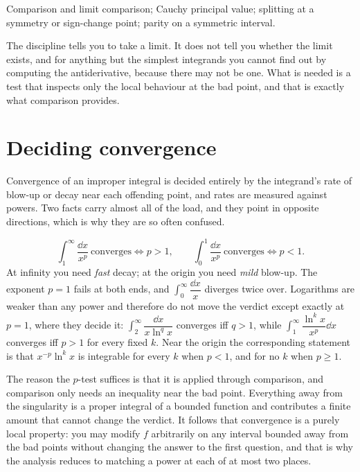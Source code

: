 \begin{seealsob}Comparison and limit comparison; Cauchy principal value; splitting at a symmetry or sign-change point; parity on a symmetric interval.\end{seealsob}

The discipline tells you to take a limit. It does not tell you whether the limit exists, and for anything but the simplest integrands you cannot find out by computing the antiderivative, because there may not be one. What is needed is a test that inspects only the local behaviour at the bad point, and that is exactly what comparison provides.

\section{Deciding convergence}

Convergence of an improper integral is decided entirely by the integrand's rate of blow-up or decay near each offending point, and rates are measured against powers. Two facts carry almost all of the load, and they point in opposite directions, which is why they are so often confused.

\begin{keynote}
\[\int_1^{\infty}\frac{\dd x}{x^{p}}\ \text{converges}\iff p>1,\qquad \int_0^{1}\frac{\dd x}{x^{p}}\ \text{converges}\iff p<1.\]
At infinity you need \emph{fast} decay; at the origin you need \emph{mild} blow-up. The exponent $p=1$ fails at both ends, and $\int_0^{\infty}\dfrac{\dd x}{x}$ diverges twice over. Logarithms are weaker than any power and therefore do not move the verdict except exactly at $p=1$, where they decide it: $\int_2^{\infty}\dfrac{\dd x}{x\ln^{q}x}$ converges iff $q>1$, while $\int_1^{\infty}\dfrac{\ln^{k}x}{x^{p}}\dd x$ converges iff $p>1$ for every fixed $k$. Near the origin the corresponding statement is that $x^{-p}\ln^{k}x$ is integrable for every $k$ when $p<1$, and for no $k$ when $p\geq1$.
\end{keynote}

The reason the $p$-test suffices is that it is applied through comparison, and comparison only needs an inequality near the bad point. Everything away from the singularity is a proper integral of a bounded function and contributes a finite amount that cannot change the verdict. It follows that convergence is a purely local property: you may modify $f$ arbitrarily on any interval bounded away from the bad points without changing the answer to the first question, and that is why the analysis reduces to matching a power at each of at most two places.

